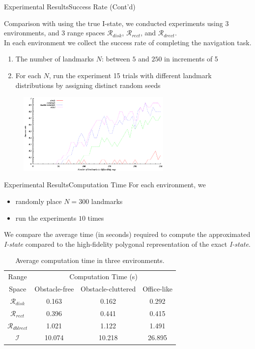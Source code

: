 \documentclass[10pt]{beamer}
\begin{document}
\begin{frame}{Experimental Results}{Success Rate (Cont'd)}
 \small{Comparison with using the true I-state, we conducted experiments using 3
 environments, and 3 range spaces $\mathcal{R}_{disk}$, $\mathcal{R}_{rect}$,
 and  $\mathcal{R}_{drect}$. \\
 In each environment we collect the success rate of completing the navigation
 task. 
 \begin{enumerate}
 \item The number of landmarks $N$: between $5$ and $250$ in increments of 5
 \item For each $N$, run the experiment 15 trials with different landmark
   distributions by assigning distinct random seeds
 \end{enumerate}
}
\begin{figure}
  \centering
  \includegraphics[width=0.67\textwidth]{Data/expnumcse}
\end{figure}
\end{frame}

\begin{frame}{Experimental Results}{Computation Time}
  For each environment, we
  \begin{itemize}
  \item randomly place $N = 300$ landmarks 
  \item run the  experiments $10$ times
  \end{itemize} 
  \begin{block}{}
    \small{We compare the average time (in seconds) required to compute the
      approximated \emph{I-state} compared to the high-fidelity polygonal
      representation of the exact \emph{I-state}.}
  \end{block}
\begin{table}
  \footnotesize\centering
    \begin{tabular}{cccc} 
    \hline
    Range & \multicolumn{3}{c}{Computation Time (s)}  \\
    Space & Obstacle-free & Obstacle-cluttered & Office-like\\
    \hline
    $\mathcal{R}_{disk}$ & 0.163  & 0.162   & 0.292  \\ 
    \hline
    $\mathcal{R}_{rect}$ & 0.396   & 0.441  & 0.415  \\
    \hline
    $\mathcal{R}_{dblrect}$ & 1.021  & 1.122  & 1.491  \\
    \hline
    $\mathcal{I}$ & 10.074  & 10.218  & 26.895  \\
    \hline
    \end{tabular}
    \caption{\scriptsize{Average computation time in three environments.}}
\end{table}
\end{frame}
\end{document}
